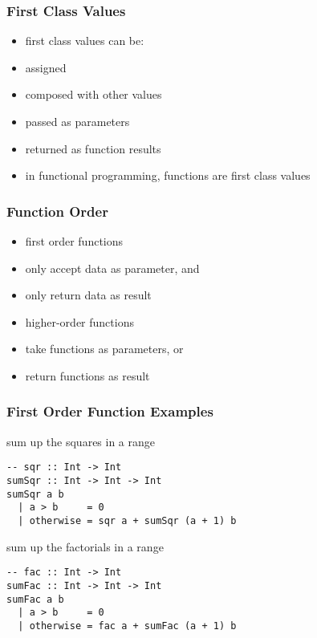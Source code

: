 \documentclass[dvipsnames]{beamer}
\theoremstyle{plain}
\begin{document}
\begin{frame}
  \frametitle{First Class Values}

  \begin{itemize}
    \item \alert{first class values} can be:

    \smallskip
    \item assigned
    \item composed with other values
    \item passed as parameters
    \item returned as function results

    \pause
    \bigskip
    \item in functional programming, functions are first class values
  \end{itemize}
\end{frame}

\begin{frame}[fragile]
  \frametitle{Function Order}

  \begin{itemize}
    \item \alert{first order functions}
    \smallskip
    \item only accept data as parameter, and
    \item only return data as result

    \pause
    \bigskip
    \item \alert{higher-order functions}
    \smallskip
    \item take functions as parameters, or
    \item return functions as result
  \end{itemize}
\end{frame}

\begin{frame}[fragile]
  \frametitle{First Order Function Examples}

  \begin{exampleblock}{sum up the squares in a range}
    \begin{lstlisting}
-- sqr :: Int -> Int
sumSqr :: Int -> Int -> Int
sumSqr a b
  | a > b     = 0
  | otherwise = sqr a + sumSqr (a + 1) b
    \end{lstlisting}
  \end{exampleblock}

  \pause
  \begin{exampleblock}{sum up the factorials in a range}
    \begin{lstlisting}
-- fac :: Int -> Int
sumFac :: Int -> Int -> Int
sumFac a b
  | a > b     = 0
  | otherwise = fac a + sumFac (a + 1) b
    \end{lstlisting}
  \end{exampleblock}
\end{frame}
\end{document}
